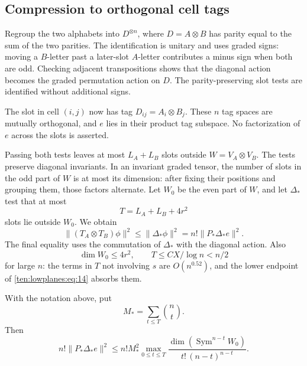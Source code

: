 \subsection{Compression to orthogonal cell tags}
\label{ten:lowplanes:part:270}

Regroup the two alphabets into \(D^{\otimes n}\), where \(D=A\otimes B\)
has parity equal to the sum of the two parities.  The identification is
unitary and uses graded signs: moving a \(B\)-letter past a later-slot
\(A\)-letter contributes a minus sign when both are odd.  Checking
adjacent transpositions shows that the diagonal action becomes the
graded permutation action on \(D\).  The parity-preserving slot tests
are identified without additional signs.

The slot in cell \((i,j)\) now has tag
\(D_{ij}=A_i\otimes B_j\).  These \(n\) tag spaces are mutually
orthogonal, and \(e\) lies in their product tag subspace.  No
factorization of \(e\) across the slots is asserted.

Passing both tests leaves at most \(L_A+L_B\) slots outside
\(W=V_A\otimes V_B\).  The tests preserve diagonal invariants.  In an
invariant graded tensor, the number of slots in the odd part of \(W\)
is at most its dimension: after fixing their positions and grouping them,
those factors alternate.  Let \(W_0\) be the even part of \(W\), and let
\(\Delta_*\) test that at most
\[
 T=L_A+L_B+4r^2
\]
slots lie outside \(W_0\).  We obtain
\begin{equation}
 \|(T_A\otimes T_B)\phi\|^2
 \le\|\Delta_*\phi\|^2
 =n!\|P_*\Delta_*e\|^2.
 \label{ten:lowplanes:eq:21}
\end{equation}
The final equality uses the commutation of \(\Delta_*\) with the
diagonal action.  Also
\[
 \dim W_0\le4r^2,\qquad
 T\le C X/\log n<n/2
\]
for large \(n\): the terms in \(T\) not involving \(s\) are
\(O(n^{0.52})\), and the lower endpoint of
\eqref{ten:lowplanes:eq:14} absorbs them.

\begin{lemma}\label{lem:cell-compression}
With the notation above, put
\[
 M_*=\sum_{t\le T}\binom nt.
\]
Then
\[
 n!\|P_*\Delta_*e\|^2
 \le n!M_*^2\max_{0\le t\le T}
 \frac{\dim(\operatorname{Sym}^{n-t}W_0)}
      {t!\,(n-t)^{n-t}}.
\]
\end{lemma}

